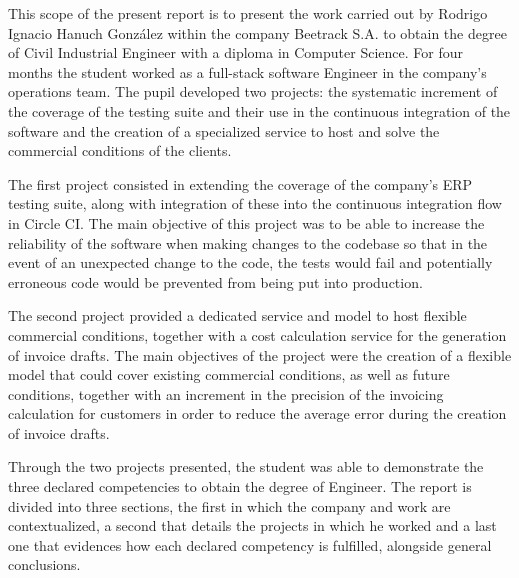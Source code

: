 This scope of the present report is to present the work carried out by Rodrigo Ignacio Hanuch González within the company Beetrack S.A. to obtain  the degree of Civil Industrial Engineer with a diploma in Computer Science. For four months the student worked as a full-stack software Engineer in the company's operations team. The pupil developed two projects: the systematic increment of the coverage of the testing suite and their use in the continuous integration of the software and the creation of a specialized service to host and solve the commercial conditions of the clients.

The first project consisted in extending the coverage of the company's ERP testing suite, along with integration of these into the continuous integration flow in Circle CI. The main objective of this project was to be able to increase the reliability of the software when making changes to the codebase so that in the event of an unexpected change to the code, the tests would fail and potentially erroneous code would be prevented from being put into production.

The second project provided a dedicated service and model to host flexible commercial conditions, together with a cost calculation service for the generation of invoice drafts. The main objectives of the project were the creation of a flexible model that could cover existing commercial conditions, as well as future conditions, together with an increment in the precision of the invoicing calculation for customers in order to reduce the average error during the creation of invoice drafts.

Through the two projects presented, the student was able to demonstrate the three declared competencies to obtain the degree of Engineer. The report is divided into three sections, the first in which the company and work are contextualized, a second that details the projects in which he worked and a last one that evidences how each declared competency is fulfilled, alongside general conclusions.